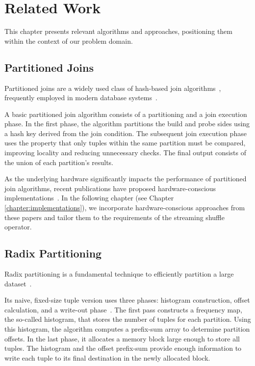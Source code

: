 
\chapter{Related Work}\label{chapter:related_work}\acresetall
This chapter presents relevant algorithms and approaches, positioning them within the context of our problem domain.

\section{Partitioned Joins}\label{sec-rw-partitioning-joins}
Partitioned joins are a widely used class of hash-based join algorithms~\parencite{joins-real-system, hash-joins-hardware-tuning, equi-join-comparison}, frequently employed in modern database systems~\parencite{umbra, hyper, hyper-compilation}.

A basic partitioned join algorithm consists of a partitioning and a join execution phase.
In the first phase, the algorithm partitions the build and probe sides using a hash key derived from the join condition.
The subsequent join execution phase uses the property that only tuples within the same partition must be compared, improving locality and reducing unnecessary checks.
The final output consists of the union of each partition’s results.

As the underlying hardware significantly impacts the performance of partitioned join algorithms, recent publications have proposed hardware-conscious implementations~\parencite{hash-joins-hardware-tuning, radix-partitioning-case, main-memory-partitioning, data-partitioning-in-memory-systems}.
In the following chapter (see Chapter \ref{chapter:implementations}), we incorporate hardware-conscious approaches from these papers and tailor them to the requirements of the streaming shuffle operator.

\section{Radix Partitioning}\label{sec-rw-radix-partitioning}
Radix partitioning is a fundamental technique to efficiently partition a large dataset~\parencite{radix-partitioning, radix-partitioning-case, data-partitioning-in-memory-systems, partitioned-parallel-radix-sort}.

Its naive, fixed-size tuple version uses three phases: histogram construction, offset calculation, and a write-out phase~\parencite{radix-partitioning-case}.
The first pass constructs a frequency map, the so-called histogram, that stores the number of tuples for each partition.
Using this histogram, the algorithm computes a prefix-sum array to determine partition offsets.
In the last phase, it allocates a memory block large enough to store all tuples.
The histogram and the offset prefix-sum provide enough information to write each tuple to its final destination in the newly allocated block.


